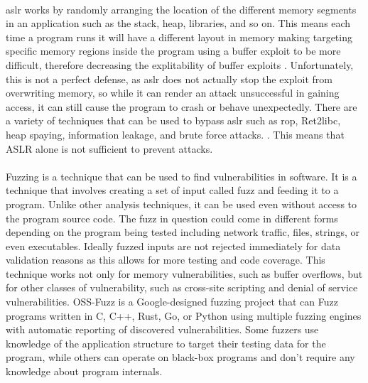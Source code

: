 \paragraph{}\acrfull{aslr} works by randomly arranging the location of the different memory segments in an application such as the stack, heap, libraries, and so on. This means each time a program runs it will have a different layout in memory making targeting specific memory regions inside the program using a buffer exploit to be more difficult, therefore decreasing the explitability of buffer exploits \autocite{syedishrarali_aslr_2024}. Unfortunately, this is not a perfect defense, as \acrshort{aslr} does not actually stop the exploit from overwriting memory, so while it can render an attack unsuccessful in gaining access, it can still cause the program to crash or behave unexpectedly. There are a variety of techniques that can be used to bypass \acrshort{aslr} such as \acrfull{rop}, Ret2libc, heap spaying, information leakage, and brute force attacks. \autocite{gallucci_aslr_2024}. This means that ASLR alone is not sufficient to prevent attacks.

\paragraph{}Fuzzing is a technique that can be used to find vulnerabilities in software. It is a technique that involves creating a set of input called fuzz and feeding it to a program. Unlike other analysis techniques, it can be used even without access to the program source code. The fuzz in question could come in different forms depending on the program being tested including network traffic, files, strings, or even executables. Ideally fuzzed inputs are not rejected immediately for data validation reasons as this allows for more testing and code coverage. This technique works not only for memory vulnerabilities, such as buffer overflows, but for other classes of vulnerability, such as cross-site scripting and denial of service vulnerabilities. OSS-Fuzz is a Google-designed fuzzing project that can Fuzz programs written in C, C++, Rust, Go, or Python using multiple fuzzing engines with automatic reporting of discovered vulnerabilities. Some fuzzers use knowledge of the application structure to target their testing data for the program, while others can operate on black-box programs and don't require any knowledge about program internals. \autocite{beaman_fuzzing_2022}

